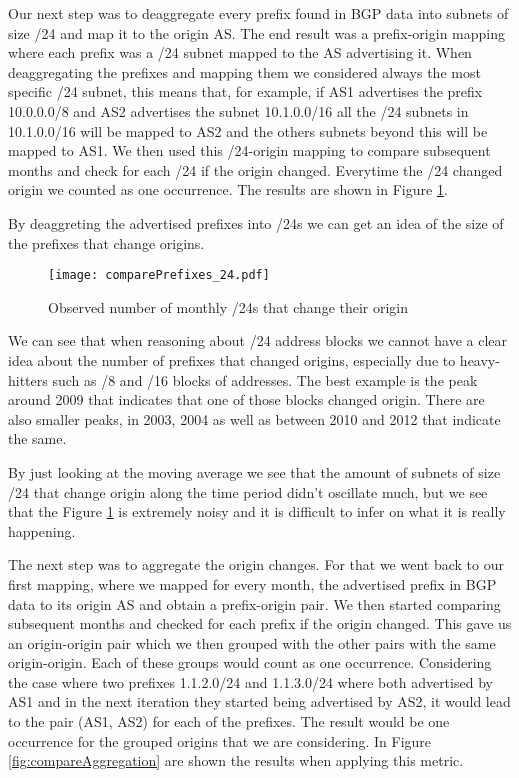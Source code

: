 \documentclass[11pt,a4paper]{scrreprt}
\begin{document}
Our next step was to deaggregate every prefix found in BGP data into subnets of size /24 and map it to the origin AS. The end result was a prefix-origin mapping where each  prefix was a /24 subnet mapped to the AS advertising it. When deaggregating the prefixes and mapping them we considered always the most specific /24 subnet, this means that, for example, if AS1 advertises the prefix 10.0.0.0/8 and AS2 advertises the subnet 10.1.0.0/16 all the /24 subnets in 10.1.0.0/16 will be mapped to AS2 and the others subnets beyond this will be mapped to AS1. We then used this /24-origin mapping to compare subsequent months and check for each /24 if the origin changed. Everytime the /24 changed origin we counted as one occurrence. The results are shown in Figure \ref{fig:comparePrefixes_24}. 

By deaggreting the advertised prefixes into /24s we can get an idea of the size of the prefixes that change origins.  

\begin{figure}[!h]
\centering
\texttt{[image: comparePrefixes\_24.pdf]}
\caption{Observed number of monthly
/24s that change their origin}
\label{fig:comparePrefixes_24}
\end{figure}

We can see that when reasoning about /24 address blocks we cannot have a clear idea about the number of prefixes that changed origins, especially due to heavy-hitters such as /8 and /16 blocks of addresses. The best example is the peak around 2009 that indicates that one of those blocks changed origin. There are also smaller peaks, in 2003, 2004 as well as between 2010 and 2012 that indicate the same. 

By just looking at the moving average we see that the amount of subnets of size /24 that change origin along the time period didn't oscillate much, but we see that the Figure \ref{fig:comparePrefixes_24} is extremely noisy and it is difficult to infer on what it is really happening.


The next step was to aggregate the origin changes. For that we went back to our first mapping, where we mapped for every month, the advertised prefix in BGP data to its origin AS and obtain a prefix-origin pair. We then started comparing subsequent months and checked for each prefix if the origin changed. This gave us an origin-origin pair which we then grouped with the other pairs with the same origin-origin. Each of these groups would count as one occurrence. Considering the case where two prefixes 1.1.2.0/24 and 1.1.3.0/24 where both advertised by AS1 and in the next iteration they started being advertised by AS2, it would lead to the pair (AS1, AS2) for each of the prefixes. The result would be one occurrence for the grouped origins that we are considering. In Figure \ref{fig:compareAggregation} are shown the results when applying this metric.       
\end{document}
